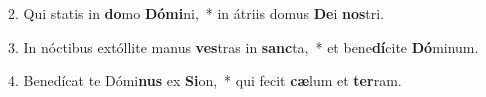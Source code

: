 2. Qui statis in \textbf{do}mo \textbf{Dó}\textbf{mi}ni,~*  in átriis domus \textbf{De}i \textbf{nos}tri.\

3. In nóctibus extóllite manus \textbf{ves}tras in \textbf{sanc}ta,~*  et bene\textbf{dí}cite \textbf{Dó}minum.\

4. Benedícat te Dómi\textbf{nus} ex \textbf{Si}on,~*  qui fecit \textbf{cæ}lum et \textbf{ter}ram.\


